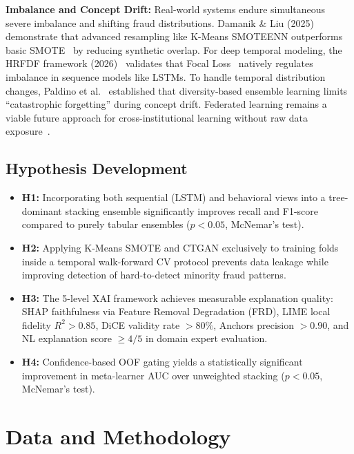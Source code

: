 \documentclass[10pt,a4paper,twocolumn]{article}
\begin{document}
\textbf{Imbalance and Concept Drift:} Real-world systems endure simultaneous severe imbalance and shifting fraud distributions. Damanik \& Liu (2025)~\cite{damanik2025} demonstrate that advanced resampling like K-Means SMOTEENN outperforms basic SMOTE~\cite{chawla2002} by reducing synthetic overlap. For deep temporal modeling, the HRFDF framework (2026)~\cite{hrfdf2026} validates that Focal Loss~\cite{lin2017focal} natively regulates imbalance in sequence models like LSTMs. To handle temporal distribution changes, Paldino et al.~\cite{paldino2024} established that diversity-based ensemble learning limits ``catastrophic forgetting'' during concept drift. Federated learning remains a viable future approach for cross-institutional learning without raw data exposure~\cite{awosika2024}.

\subsection{Hypothesis Development}
\begin{itemize}
    \item \textbf{H1:} Incorporating both sequential (LSTM) and behavioral views into a tree-dominant stacking ensemble significantly improves recall and F1-score compared to purely tabular ensembles ($p < 0.05$, McNemar's test).
    \item \textbf{H2:} Applying K-Means SMOTE and CTGAN exclusively to training folds inside a temporal walk-forward CV protocol prevents data leakage while improving detection of hard-to-detect minority fraud patterns.
    \item \textbf{H3:} The 5-level XAI framework achieves measurable explanation quality: SHAP faithfulness via Feature Removal Degradation (FRD), LIME local fidelity $R^2 > 0.85$, DiCE validity rate $> 80\%$, Anchors precision $> 0.90$, and NL explanation score $\geq 4/5$ in domain expert evaluation.
    \item \textbf{H4:} Confidence-based OOF gating yields a statistically significant improvement in meta-learner AUC over unweighted stacking ($p < 0.05$, McNemar's test).
\end{itemize}

\section{Data and Methodology}
\end{document}

